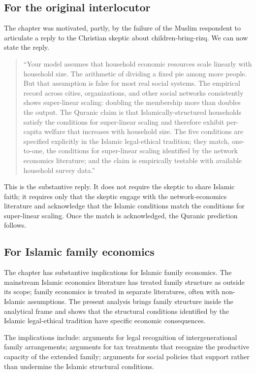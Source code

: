\subsection{For the original interlocutor}

The chapter was motivated, partly, by the failure of the Muslim
respondent to articulate a reply to the Christian skeptic about
children-bring-rizq. We can now state the reply.

\begin{quote}
``Your model assumes that household economic resources scale
linearly with household size. The arithmetic of dividing a fixed
pie among more people. But that assumption is false for most real
social systems. The empirical record across cities, organizations,
and other social networks consistently shows super-linear scaling:
doubling the membership more than doubles the output. The Quranic
claim is that Islamically-structured households satisfy the
conditions for super-linear scaling and therefore exhibit per-capita
welfare that increases with household size. The five conditions are
specified explicitly in the Islamic legal-ethical tradition; they
match, one-to-one, the conditions for super-linear scaling
identified by the network economics literature; and the claim is
empirically testable with available household survey data.''
\end{quote}

This is the substantive reply. It does not require the skeptic to
share Islamic faith; it requires only that the skeptic engage with
the network-economics literature and acknowledge that the Islamic
conditions match the conditions for super-linear scaling. Once the
match is acknowledged, the Quranic prediction follows.

\subsection{For Islamic family economics}

The chapter has substantive implications for Islamic family
economics. The mainstream Islamic economics literature has treated
family structure as outside its scope; family economics is treated
in separate literatures, often with non-Islamic assumptions. The
present analysis brings family structure inside the analytical
frame and shows that the structural conditions identified by the
Islamic legal-ethical tradition have specific economic consequences.

The implications include: arguments for legal recognition of
intergenerational family arrangements; arguments for tax
treatments that recognize the productive capacity of the extended
family; arguments for social policies that support rather than
undermine the Islamic structural conditions.

